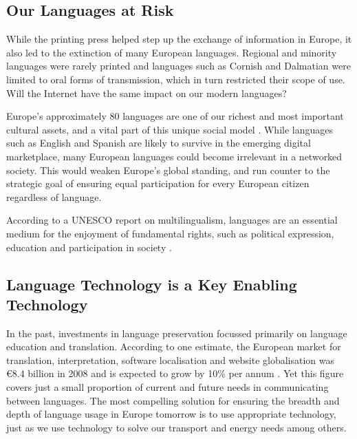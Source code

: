 \begin{multicols}{2}
\subsection{Our Languages at Risk}

While the printing press helped step up the exchange of information in Europe, it also led to the extinction of many European languages. Regional and minority languages were rarely printed and languages such as Cornish and Dalmatian were limited to oral forms of transmission, which in turn restricted their scope of use. Will the Internet have the same impact on our modern languages?\vspace*{0.1 cm}

Europe’s approximately 80 languages are one of our richest and most important cultural assets, and a vital part of this unique social mo\-del \cite{EC2}. While languages such as English and Spanish are likely to survive in the emerging digital marketplace, many European languages could become irrelevant in a networked society. This would weaken Europe’s global standing, and run counter to the strategic goal of ensuring equal participation for every European citizen regardless of language. \vspace*{0.1 cm}

According to a UNESCO report on multilingualism, languages are an essential medium for the enjoyment of fundamental rights, such as political expression, education and participation in society \cite{Unesco1}.


\subsection{Language Technology is a Key Enabling Technology}

In the past, investments in language preservation focussed primarily on language education and translation. According to one estimate, the European market for translation, interpretation, software localisation and website globalisation was €8.4 billion in 2008 and is expected to grow by 10\% per annum \cite{EC3}. Yet this figure covers just a small proportion of current and future needs in communicating between languages. The most compelling solution for ensuring the breadth and depth of language usage in Europe tomorrow is to use appropriate technology, just as we use technology to solve our transport and energy needs among others.


\end{multicols}
